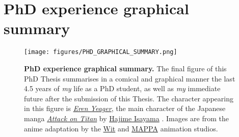 \chapter*{PhD experience graphical summary}

\begin{figure}[htb!]
    \centering
    \texttt{[image: figures/PHD\_GRAPHICAL\_SUMMARY.png]}
    \caption[PhD experience graphical summary]{\textbf{PhD experience graphical summary.} The final figure of this PhD Thesis summarises in a comical and graphical manner the last 4.5 years of \textit{my} life as a PhD student, as well as \textit{my} immediate future after the submission of this Thesis. The character appearing in this figure is \href{https://attackontitan.fandom.com/wiki/Eren_Yeager}{\textit{Eren Yeager}}, the main character of the Japanese manga \href{https://en.wikipedia.org/wiki/Attack_on_Titan}{\textit{Attack on Titan}} by \href{https://en.wikipedia.org/wiki/Hajime_Isayama}{Hajime Isayama} \cite{ISAYAMA_2021}. Images are from the anime adaptation by the \href{https://en.wikipedia.org/wiki/Wit_Studio}{Wit} and \href{https://en.wikipedia.org/wiki/MAPPA}{MAPPA} animation studios.}
    \label{fig:phd_graph_summary}
\end{figure}